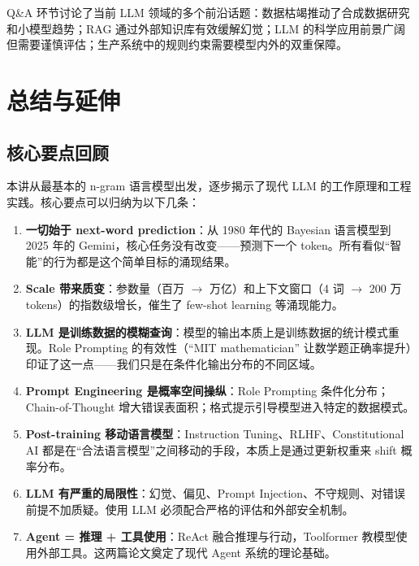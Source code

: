 \documentclass[a4paper]{article}
\begin{document}
Q\&A 环节讨论了当前 LLM 领域的多个前沿话题：数据枯竭推动了合成数据研究和小模型趋势；RAG 通过外部知识库有效缓解幻觉；LLM 的科学应用前景广阔但需要谨慎评估；生产系统中的规则约束需要模型内外的双重保障。

\section{总结与延伸}

\subsection{核心要点回顾}

本讲从最基本的 n-gram 语言模型出发，逐步揭示了现代 LLM 的工作原理和工程实践。核心要点可以归纳为以下几条：

\begin{enumerate}
    \item \textbf{一切始于 next-word prediction}：从 1980 年代的 Bayesian 语言模型到 2025 年的 Gemini，核心任务没有改变——预测下一个 token。所有看似``智能''的行为都是这个简单目标的涌现结果。

    \item \textbf{Scale 带来质变}：参数量（百万 $\rightarrow$ 万亿）和上下文窗口（4 词 $\rightarrow$ 200 万 tokens）的指数级增长，催生了 few-shot learning 等涌现能力。

    \item \textbf{LLM 是训练数据的模糊查询}：模型的输出本质上是训练数据的统计模式重现。Role Prompting 的有效性（``MIT mathematician'' 让数学题正确率提升）印证了这一点——我们只是在条件化输出分布的不同区域。

    \item \textbf{Prompt Engineering 是概率空间操纵}：Role Prompting 条件化分布；Chain-of-Thought 增大错误表面积；格式提示引导模型进入特定的数据模式。

    \item \textbf{Post-training 移动语言模型}：Instruction Tuning、RLHF、Constitutional AI 都是在``合法语言模型''之间移动的手段，本质上是通过更新权重来 shift 概率分布。

    \item \textbf{LLM 有严重的局限性}：幻觉、偏见、Prompt Injection、不守规则、对错误前提不加质疑。使用 LLM 必须配合严格的评估和外部安全机制。

    \item \textbf{Agent = 推理 + 工具使用}：ReAct 融合推理与行动，Toolformer 教模型使用外部工具。这两篇论文奠定了现代 Agent 系统的理论基础。
\end{enumerate}
\end{document}

